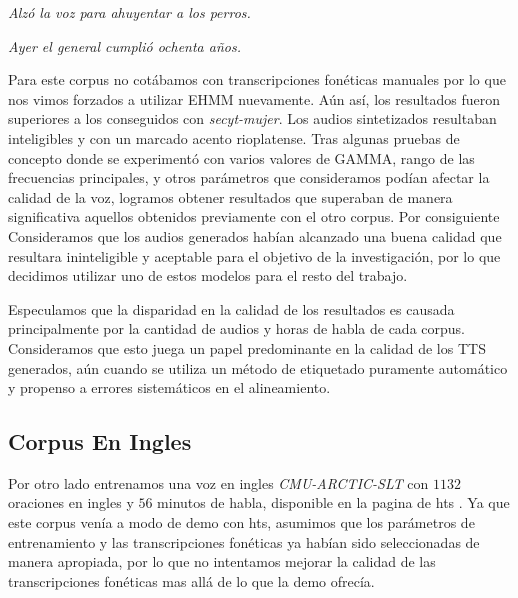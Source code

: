 \indent\indent \textit{Alzó la voz para ahuyentar a los perros.}

\indent\indent \textit{Ayer el general cumplió ochenta años.}

Para este corpus no cotábamos con transcripciones fonéticas manuales por lo que nos vimos forzados a utilizar EHMM nuevamente. Aún así, los resultados fueron superiores a los conseguidos con \textit{secyt-mujer}. Los audios sintetizados resultaban inteligibles y con un marcado acento rioplatense. Tras algunas pruebas de concepto donde se experimentó con varios valores de GAMMA, rango de las frecuencias principales, y otros parámetros que consideramos podían afectar la calidad de la voz, logramos obtener resultados que superaban de manera significativa aquellos obtenidos previamente con el otro corpus. Por consiguiente Consideramos que los audios generados habían alcanzado una buena calidad que resultara ininteligible y aceptable para el objetivo de la investigación, por lo que decidimos utilizar uno de estos modelos para el resto del trabajo.


Especulamos que la disparidad en la calidad de los resultados es causada principalmente por la cantidad de audios y horas de habla de cada corpus\cite{whyItSucked}. Consideramos que esto juega un papel predominante en la calidad de los TTS generados, aún cuando se utiliza un método de etiquetado puramente automático y propenso a errores sistemáticos en el alineamiento.


\subsection{Corpus En Ingles}

Por otro lado entrenamos una voz en ingles \textit{CMU-ARCTIC-SLT}\cite{cmuArtic} con $1132$ oraciones en ingles y $56$ minutos de habla, disponible en la pagina de hts \cite{hts}. Ya que este corpus venía a modo de demo con hts, asumimos que los parámetros de entrenamiento y las transcripciones fonéticas ya habían sido seleccionadas de manera apropiada, por lo que no intentamos mejorar la calidad de las transcripciones fonéticas mas allá de lo que la demo ofrecía.

